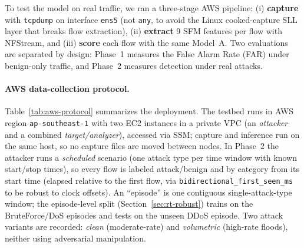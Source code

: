 \documentclass[preprint,12pt,authoryear]{elsarticle}
\begin{document}
To test the model on real traffic, we ran a three-stage AWS pipeline:
(i) \textbf{capture} with \texttt{tcpdump} on interface \texttt{ens5} (not
\texttt{any}, to avoid the Linux cooked-capture SLL layer that breaks flow
extraction), (ii) \textbf{extract} 9 SFM features per flow with NFStream, and
(iii) \textbf{score} each flow with the same Model~A. Two evaluations are separated
by design: Phase~1 measures the False Alarm Rate (FAR) under benign-only traffic,
and Phase~2 measures detection under real attacks.

\paragraph{AWS data-collection protocol.} Table~\ref{tab:aws-protocol} summarizes
the deployment. The testbed runs in AWS region \texttt{ap-southeast-1} with two EC2
instances in a private VPC (an \emph{attacker} and a combined
\emph{target/analyzer}), accessed via SSM; capture and inference run on the same
host, so no capture files are moved between nodes. In Phase~2 the attacker runs a
\emph{scheduled} scenario (one attack type per time window with known start/stop
times), so every flow is labeled attack/benign and by category from its start time
(elapsed relative to the first flow, via \texttt{bidirectional\_first\_seen\_ms} to
be robust to clock offsets). An ``episode'' is one contiguous single-attack-type
window; the episode-level split (Section~\ref{sec:rt-robust}) trains on the
BruteForce/DoS episodes and tests on the unseen DDoS episode. Two attack variants
are recorded: \emph{clean} (moderate-rate) and \emph{volumetric} (high-rate
floods), neither using adversarial manipulation.
\end{document}

